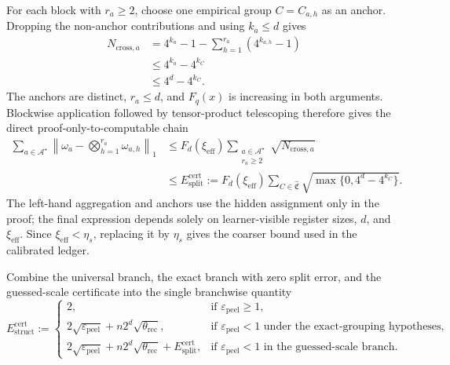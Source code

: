 \documentclass[
  aps,
  prx,
  reprint,
  superscriptaddress,
  amsmath,
  amssymb,
  nofootinbib,
  longbibliography
]{revtex4-2}
\begin{document}
For each block with $r_a\ge2$, choose one empirical group $C=C_{a,h}$ as
an anchor.  Dropping the non-anchor contributions and using $k_a\le d$
gives
\begin{align}
N_{\mathrm{cross},a}
&=
4^{k_a}-1
-
\sum_{h=1}^{r_a}(4^{k_{a,h}}-1)
\nonumber\\
&\le
4^{k_a}-4^{k_C}
\nonumber\\
&\le
4^d-4^{k_C}.
\end{align}
The anchors are distinct, $r_a\le d$, and $F_q(x)$ is increasing in both
arguments.  Blockwise application followed by tensor-product telescoping
therefore gives the direct proof-only-to-computable chain
\begin{align}
\sum_{a\in\mathcal A^\star}
\left\|\omega_a-\bigotimes_{h=1}^{r_a}\omega_{a,h}\right\|_1
&\le
F_d(\xi_{\mathrm{eff}})
\sum_{\substack{a\in\mathcal A^\star\\r_a\ge2}}
\sqrt{N_{\mathrm{cross},a}}
\nonumber\\
&\le
E_{\mathrm{split}}^{\mathrm{cert}}
:=
F_d(\xi_{\mathrm{eff}})
\sum_{C\in\widehat{\mathfrak C}}
\sqrt{\max\{0,4^d-4^{k_C}\}}.
\label{eq:supp-computable-split-error-certificate}
\end{align}
The left-hand aggregation and anchors use the hidden assignment only in the
proof; the final expression depends solely on learner-visible register sizes,
$d$, and $\xi_{\mathrm{eff}}$.  Since $\xi_{\mathrm{eff}}<\eta_s$, replacing
it by $\eta_s$ gives the coarser bound used in the calibrated ledger.

Combine the universal branch, the exact branch with zero split error, and
the guessed-scale certificate into the single branchwise quantity
\begin{equation}
E_{\mathrm{struct}}^{\mathrm{cert}}
:=
\begin{cases}
2,
&\text{if }\varepsilon_{\mathrm{peel}}\ge1,\\[1mm]
2\sqrt{\varepsilon_{\mathrm{peel}}}
+n2^d\sqrt{\theta_{\mathrm{rec}}},
&\text{if }\varepsilon_{\mathrm{peel}}<1
\text{ under the exact-grouping hypotheses},\\[2mm]
2\sqrt{\varepsilon_{\mathrm{peel}}}
+n2^d\sqrt{\theta_{\mathrm{rec}}}
+E_{\mathrm{split}}^{\mathrm{cert}},
&\text{if }\varepsilon_{\mathrm{peel}}<1
\text{ in the guessed-scale branch}.
\end{cases}
\label{eq:supp-localization-structural-certificate}
\end{equation}
\end{document}
